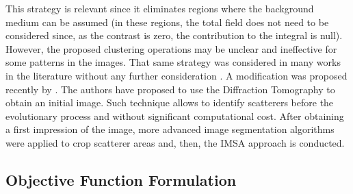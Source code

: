 			This strategy is relevant since it eliminates regions where the background medium can be assumed (in these regions, the total field does not need to be considered since, as the contrast is zero, the contribution to the integral is null). However, the proposed clustering operations may be unclear and ineffective for some patterns in the images. That same strategy was considered in many works in the literature without any further consideration \citep{donelli2006integrated,donelli2009three,benedetti2010multiple,oliveri2011multiresolution,oliveri2012nested,salucci2017multifrequency,zhong2020multiresolution}. A modification was proposed recently by \cite{hajebi2022multiple}. The authors have proposed to use the Diffraction Tomography to obtain an initial image. Such technique allows to identify scatterers before the evolutionary process and without significant computational cost. After obtaining a first impression of the image, more advanced image segmentation algorithms were applied to crop scatterer areas and, then, the IMSA approach is conducted.

		\subsection{Objective Function Formulation}\label{chap:methods:stochastic:objfun}
			
